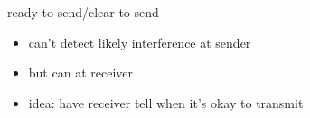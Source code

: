 
\begin{frame}{ready-to-send/clear-to-send}
    \begin{itemize}
    \item can't detect likely interference at sender
    \item but can at receiver
    \vspace{.5cm}
    \item idea: have receiver tell when it's okay to transmit
    \end{itemize}
\end{frame}
